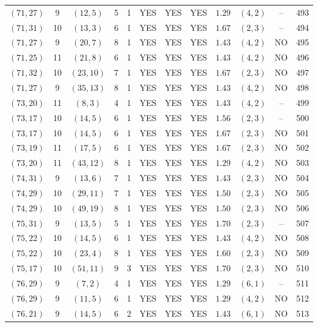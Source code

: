 \begin{longtable}{|c|c|c|c|c|c|c|c|c|c|c|c|}
$(71,27)$ & 9 & $(12,5)$ & 5 & 1 & YES & YES & YES & $1.29$ & $(4,2)$ & -- & 493\\
$(71,31)$ & 10 & $(13,3)$ & 6 & 1 & YES & YES & YES & $1.67$ & $(2,3)$ & -- & 494\\
$(71,27)$ & 9 & $(20,7)$ & 8 & 1 & YES & YES & YES & $1.43$ & $(4,2)$ & NO & 495\\
$(71,25)$ & 11 & $(21,8)$ & 6 & 1 & YES & YES & YES & $1.43$ & $(4,2)$ & NO & 496\\
$(71,32)$ & 10 & $(23,10)$ & 7 & 1 & YES & YES & YES & $1.67$ & $(2,3)$ & NO & 497\\
$(71,27)$ & 9 & $(35,13)$ & 8 & 1 & YES & YES & YES & $1.43$ & $(4,2)$ & NO & 498\\
$(73,20)$ & 11 & $(8,3)$ & 4 & 1 & YES & YES & YES & $1.43$ & $(4,2)$ & -- & 499\\
$(73,17)$ & 10 & $(14,5)$ & 6 & 1 & YES & YES & YES & $1.56$ & $(2,3)$ & -- & 500\\
$(73,17)$ & 10 & $(14,5)$ & 6 & 1 & YES & YES & YES & $1.67$ & $(2,3)$ & NO & 501\\
$(73,19)$ & 11 & $(17,5)$ & 6 & 1 & YES & YES & YES & $1.67$ & $(2,3)$ & NO & 502\\
$(73,20)$ & 11 & $(43,12)$ & 8 & 1 & YES & YES & YES & $1.29$ & $(4,2)$ & NO & 503\\
$(74,31)$ & 9 & $(13,6)$ & 7 & 1 & YES & YES & YES & $1.43$ & $(2,3)$ & NO & 504\\
$(74,29)$ & 10 & $(29,11)$ & 7 & 1 & YES & YES & YES & $1.50$ & $(2,3)$ & NO & 505\\
$(74,29)$ & 10 & $(49,19)$ & 8 & 1 & YES & YES & YES & $1.50$ & $(2,3)$ & NO & 506\\
$(75,31)$ & 9 & $(13,5)$ & 5 & 1 & YES & YES & YES & $1.70$ & $(2,3)$ & -- & 507\\
$(75,22)$ & 10 & $(14,5)$ & 6 & 1 & YES & YES & YES & $1.43$ & $(4,2)$ & NO & 508\\
$(75,22)$ & 10 & $(23,4)$ & 8 & 1 & YES & YES & YES & $1.60$ & $(2,3)$ & NO & 509\\
$(75,17)$ & 10 & $(51,11)$ & 9 & 3 & YES & YES & YES & $1.70$ & $(2,3)$ & NO & 510\\
$(76,29)$ & 9 & $(7,2)$ & 4 & 1 & YES & YES & YES & $1.29$ & $(6,1)$ & -- & 511\\
$(76,29)$ & 9 & $(11,5)$ & 6 & 1 & YES & YES & YES & $1.29$ & $(4,2)$ & NO & 512\\
$(76,21)$ & 9 & $(14,5)$ & 6 & 2 & YES & YES & YES & $1.43$ & $(6,1)$ & NO & 513\\

\end{longtable}
